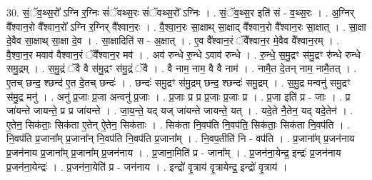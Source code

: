 \documentclass[17pt]{extarticle}
\begin{document}
30. सं॒ॅव॒थ्स॒रो᳚ ऽग्नि र॒ग्निः सं॑ॅवथ्स॒रः सं॑ॅवथ्स॒रो᳚ ऽग्निः । . सं॒ॅव॒थ्स॒र इति॑ सं - व॒थ्स॒रः । . अ॒ग्निर् वै᳚श्वान॒रो वै᳚श्वान॒रो᳚ ऽग्नि र॒ग्निर् वै᳚श्वान॒रः । . वै॒श्वा॒न॒रः सा॒क्षाथ् सा॒क्षाद् वै᳚श्वान॒रो वै᳚श्वान॒रः सा॒क्षात् । . सा॒क्षा दे॒वैव सा॒क्षाथ् सा॒क्षा दे॒व । . सा॒क्षादिति॑ स - अ॒क्षात् । . ए॒व वै᳚श्वान॒रं ॅवै᳚श्वान॒र मे॒वैव वै᳚श्वान॒रम् । . वै॒श्वा॒न॒र मवाव॑ वैश्वान॒रं ॅवै᳚श्वान॒र मव॑ । . अव॑ रुन्धे रु॒न्धे ऽवाव॑ रुन्धे । . रु॒न्धे॒ स॒मु॒द्रꣳ स॑मु॒द्रꣳ रु॑न्धे रुन्धे समु॒द्रम् । . स॒मु॒द्रं ॅवै वै स॑मु॒द्रꣳ स॑मु॒द्रं ॅवै । . वै नाम॒ नाम॒ वै वै नाम॑ । . नामै॒त दे॒तन् नाम॒ नामै॒तत् । . ए॒तच् छन्द॒ श्छन्द॑ ए॒त दे॒तच् छन्दः॑ । . छन्दः॑ समु॒द्रꣳ स॑मु॒द्रम् छन्द॒ श्छन्दः॑ समु॒द्रम् । . स॒मु॒द्र मन्वनु॑ समु॒द्रꣳ स॑मु॒द्र मनु॑ । . अनु॑ प्र॒जाः प्र॒जा अन्वनु॑ प्र॒जाः । . प्र॒जाः प्र प्र प्र॒जाः प्र॒जाः प्र । . प्र॒जा इति॑ प्र - जाः । . प्र जा॑यन्ते जायन्ते॒ प्र प्र जा॑यन्ते । . जा॒य॒न्ते॒ यद् यज् जा॑यन्ते जायन्ते॒ यत् । . यदे॒ते नै॒तेन॒ यद् यदे॒तेन॑ । . ए॒तेन॒ सिक॑ताः॒ सिक॑ता ए॒तेन् ऐ॒तेन॒ सिक॑ताः । . सिक॑ता नि॒वप॑ति नि॒वप॑ति॒ सिक॑ताः॒ सिक॑ता नि॒वप॑ति । . नि॒वप॑ति प्र॒जाना᳚म् प्र॒जाना᳚न् नि॒वप॑ति नि॒वप॑ति प्र॒जाना᳚म् । . नि॒वप॒तीति॑ नि - वप॑ति । . प्र॒जाना᳚म् प्र॒जन॑नाय प्र॒जन॑नाय प्र॒जाना᳚म् प्र॒जाना᳚म् प्र॒जन॑नाय । . प्र॒जाना॒मिति॑ प्र - जाना᳚म् । . प्र॒जन॑ना॒येन्द्र॒ इन्द्रः॑ प्र॒जन॑नाय प्र॒जन॑ना॒येन्द्रः॑ । . प्र॒जन॑ना॒येति॑ प्र - जन॑नाय । . इन्द्रो॑ वृ॒त्राय॑ वृ॒त्रायेन्द्र॒ इन्द्रो॑ वृ॒त्राय॑ । \newline
\end{document}
